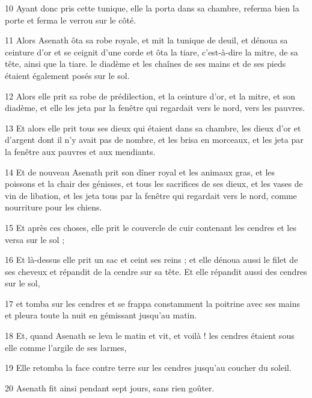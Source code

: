 \par 10 Ayant donc pris cette tunique, elle la porta dans sa chambre, referma bien la porte et ferma le verrou sur le côté.

\par 11 Alors Asenath ôta sa robe royale, et mit la tunique de deuil, et dénoua sa ceinture d'or et se ceignit d'une corde et ôta la tiare, c'est-à-dire la mitre, de sa tête, ainsi que la tiare. le diadème et les chaînes de ses mains et de ses pieds étaient également posés sur le sol.

\par 12 Alors elle prit sa robe de prédilection, et la ceinture d'or, et la mitre, et son diadème, et elle les jeta par la fenêtre qui regardait vers le nord, vers les pauvres.

\par 13 Et alors elle prit tous ses dieux qui étaient dans sa chambre, les dieux d'or et d'argent dont il n'y avait pas de nombre, et les brisa en morceaux, et les jeta par la fenêtre aux pauvres et aux mendiants.

\par 14 Et de nouveau Asenath prit son dîner royal et les animaux gras, et les poissons et la chair des génisses, et tous les sacrifices de ses dieux, et les vases de vin de libation, et les jeta tous par la fenêtre qui regardait vers le nord, comme nourriture pour les chiens.

\par 15 Et après ces choses, elle prit le couvercle de cuir contenant les cendres et les versa sur le sol ;

\par 16 Et là-dessus elle prit un sac et ceint ses reins ; et elle dénoua aussi le filet de ses cheveux et répandit de la cendre sur sa tête. Et elle répandit aussi des cendres sur le sol,

\par 17 et tomba sur les cendres et se frappa constamment la poitrine avec ses mains et pleura toute la nuit en gémissant jusqu'au matin.

\par 18 Et, quand Asenath se leva le matin et vit, et voilà ! les cendres étaient sous elle comme l'argile de ses larmes,

\par 19 Elle retomba la face contre terre sur les cendres jusqu'au coucher du soleil.

\par 20 Asenath fit ainsi pendant sept jours, sans rien goûter.

